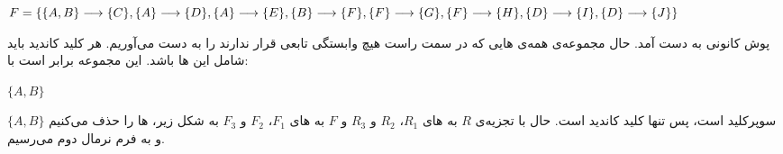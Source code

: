 \documentclass{article}
\begin{document}
\begin{itemize}
\begin{latin}
$
\\F=\\
\{\\
\{A, B\}\longrightarrow\{C\},\\
\{A\}\longrightarrow\{D\},\\
\{A\}\longrightarrow\{E\},\\
\{B\}\longrightarrow\{F\},\\
\{F\}\longrightarrow\{G\},\\
\{F\}\longrightarrow\{H\},\\
\{D\}\longrightarrow\{I\},\\
\{D\}\longrightarrow\{J\}\\
\}
$
\end{latin}
\end{itemize}
پوش کانونی به دست آمد. حال مجموعه‌ی همه‌ی هایی که در سمت راست هیچ وابستگی تابعی قرار ندارند را به دست می‌آوریم. هر کلید کاندید باید شامل این ها باشد. این مجموعه برابر است با:
\begin{latin}
$
\{A, B\}
$
\end{latin}
$
\{A, B\}
$
سوپرکلید است، پس تنها کلید کاندید است.
\newline
حال با تجزیه‌ی $R$ به های 
$R_{1}$، $R_{2}$ و $R_{3}$
و $F$ به
 های $F_{1}$، $F_{2}$ و $F_{3}$ 
به شکل زیر،
 ها را حذف می‌کنیم و به فرم نرمال دوم می‌رسیم.
\end{document}
